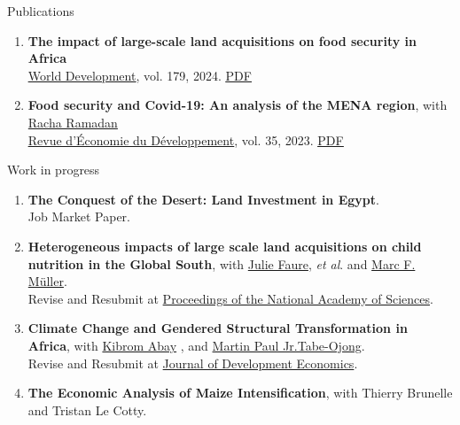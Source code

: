 \documentclass[
]{resume}
\begin{document}
\begin{small}
\begin{rSection}{Publications}
\begin{enumerate}
\item \textbf{The impact of large-scale land acquisitions on food security in Africa} \\
\href{https://www.sciencedirect.com/science/article/pii/S0305750X24000676}{\uline{World Development}}, vol. 179, 2024. \href{https://antoinecastet.github.io/AntoineCastet/PDF/aa8269af-a102-4e7c-9a76-0427fdb18943.pdf}{\uline{PDF}}
\item \textbf{Food security and Covid-19: An analysis of the MENA region}, with \href{https://scholar.google.com/citations?user=OH-yKZQAAAAJ&hl=en}{Racha Ramadan} \\
\href{https://shs.cairn.info/revue-d-economie-du-developpement-2023-3-page-29?tab=resume}{\uline{Revue d’Économie du Développement}}, vol. 35, 2023. \href{https://antoinecastet.github.io/AntoineCastet/PDF/castet-2023-la-securite-alimentaire-a-lepreuve-du-covid-19-une-analyse-de-la-region-moan.pdf}{\uline{PDF}} \\
\end{enumerate}
\end{rSection}

\begin{rSection}{Work in progress}
\begin{enumerate}
\item \textbf{The Conquest of the Desert: Land Investment in Egypt}. \\
Job Market Paper.
\item \textbf{Heterogeneous impacts of large scale land acquisitions on child nutrition in the Global South}, with \href{https://scholar.google.com.tw/citations?user=S2iiM2kAAAAJ&hl=ja}{Julie Faure}, \textit{et al}. and \href{https://scholar.google.com/citations?user=jnHeBrcAAAAJ&hl=en}{Marc F. Müller}. \\
Revise and Resubmit at \uline{Proceedings of the National Academy of Sciences}.

\item \textbf{Climate Change and Gendered Structural Transformation in Africa}, with \href{https://scholar.google.com/citations?user=-ga5p8UAAAAJ&hl=en}{Kibrom Abay} , and \href{https://scholar.google.com/citations?user=OwxVewYAAAAJ&hl=en}{Martin Paul Jr.Tabe-Ojong}.\\
Revise and Resubmit at \uline{Journal of Development Economics}.

\item \textbf{The Economic Analysis of Maize Intensification}, with Thierry Brunelle and Tristan Le Cotty.
\end{enumerate}
\end{rSection}


\end{small}
\end{document}
